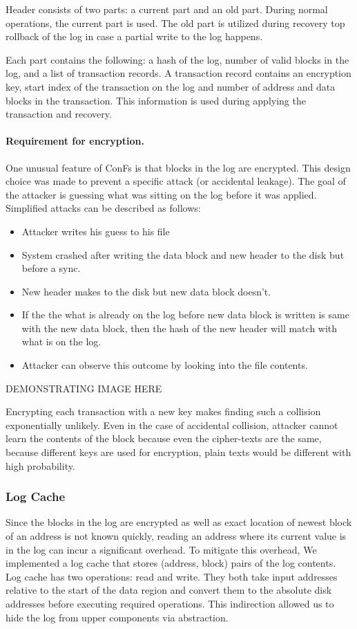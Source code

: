Header consists of two parts: a current part and an old part. During normal operations, the current part is used. The old part is utilized during recovery top rollback of the log in case a partial write to the log happens.

Each part contains the following: a hash of the log, number of valid blocks in the log, and a list of transaction records. A transaction record contains an encryption key, start index of the transaction on the log and number of address and data blocks in the transaction. This information is used during applying the transaction and recovery.

\paragraph{Requirement for encryption.}
One unusual feature of ConFs is that blocks in the log are encrypted. This design choice was made to prevent a specific attack (or accidental leakage). The goal of the attacker is guessing what was sitting on the log before it was applied. Simplified attacks can be described as follows:

\begin{itemize}
    \item Attacker writes his guess to his file
    \item System crashed after writing the data block and new header to the disk but before a sync.
    \item New header makes to the disk but new data block doesn't.
    \item If the the what is already on the log before new data block is written is same with the new data block, then the hash of the new header will match with what is on the log.
    \item Attacker can observe this outcome by looking into the file contents.
\end{itemize}

{\color{red} DEMONSTRATING IMAGE HERE}

Encrypting each transaction with a new key makes finding such a collision exponentially unlikely. Even in the case of accidental collision, attacker cannot learn the contents of the block because even the cipher-texts are the same, because different keys are used for encryption, plain texts would be different with high probability.

\subsubsection*{Log Cache}
Since the blocks in the log are encrypted as well as exact location of newest block of an address is not known quickly, reading an address where its current value is in the log can incur a significant overhead. To mitigate this overhead, We implemented a log cache that stores (address, block) pairs of the log contents. Log cache has two operations: read and write. They both take input addresses relative to the start of the data region and convert them to the absolute disk addresses before executing required operations. This indirection allowed us to hide the log from upper components via abstraction.

